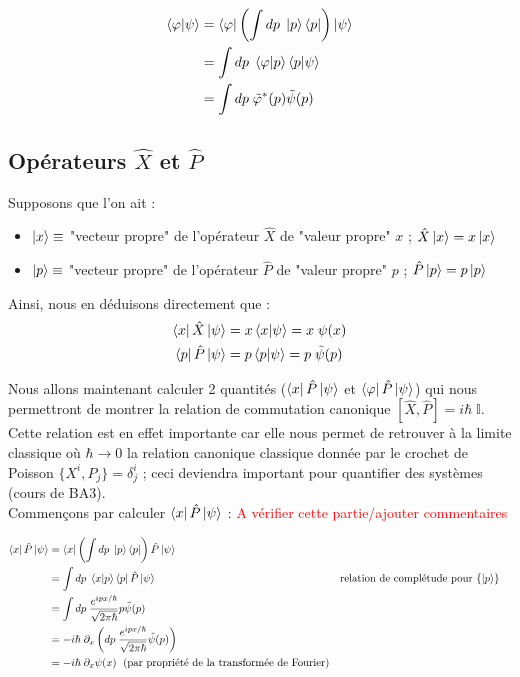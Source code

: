 \documentclass{article}
\begin{document}
\begin{align}
        \braket{\varphi | \psi} &= \bra{\varphi} \left( \int dp \; \ket{p}\bra{p} \right) \ket{\psi} \\
        &= \int dp \; \braket{\varphi |p}\braket{p|\psi} \\
        &= \int dp \; \tilde{\varphi}^*(p)\tilde{\psi}(p)
\end{align}

\subsection*{Opérateurs $\hat{X}$ et $\hat{P}$}

Supposons que l'on ait : \begin{itemize}[label=\textbullet]
    \item $\ket{x} \equiv$ "vecteur propre" de l'opérateur $\hat{X}$ de "valeur propre" $x$ ; $\hat{X}\ket{x} = x\ket{x}$
    \item $\ket{p} \equiv$ "vecteur propre" de l'opérateur $\hat{P}$ de "valeur propre" $p$ ; $\hat{P}\ket{p} = p\ket{p}$
\end{itemize}

Ainsi, nous en déduisons directement que : 
\begin{align}
    \bra{x}\hat{X}\ket{\psi} &= x \braket{x|\psi} = x \; \psi(x) \\
    \bra{p}\hat{P}\ket{\psi} &= p \braket{p|\psi} = p \; \tilde{\psi}(p) \\
\end{align}

Nous allons maintenant calculer 2 quantités ($\bra{x}\hat{P}\ket{\psi}$ et $\bra{\varphi} \hat{P} \ket{\psi}$) qui nous permettront de montrer la relation de commutation canonique $[ \hat{X}, \hat{P}] = i\hbar \; \mathbb{I}$. Cette relation est en effet importante car elle nous permet de retrouver à la limite classique où $\hbar \rightarrow 0$ la relation canonique classique donnée par le crochet de Poisson $\{ X^i,P_j \} = \delta^i_j$ ; ceci deviendra important pour quantifier des systèmes (cours de BA3). \\
Commençons par calculer $\bra{x}\hat{P}\ket{\psi}$ : \textcolor{red}{A vérifier cette partie/ajouter commentaires}

\begin{align}
    \bra{x}\hat{P}\ket{\psi} &= \bra{x} \left( \int dp \; \ket{p} \bra{p} \right) \hat{P} \ket{\psi} \notag \\
	&= \int dp \; \braket{x|p} \bra{p}\hat{P}\ket{\psi} && \text{relation de complétude pour $\{\ket p\}$} \\
    &= \int dp \; \frac{e^{ipx/\hbar}}{\sqrt{2\pi \hbar}} p \tilde{\psi}(p) \notag \\
    &= -i \hbar \; \partial_x \left( dp \; \frac{e^{ipx/\hbar}}{\sqrt{2 \pi \hbar}} \tilde{\psi}(p) \right) \notag \\
    &= -i \hbar \; \partial_x \psi(x) \; \mbox{ (par propriété de la transformée de Fourier)}
\end{align}
\end{document}
